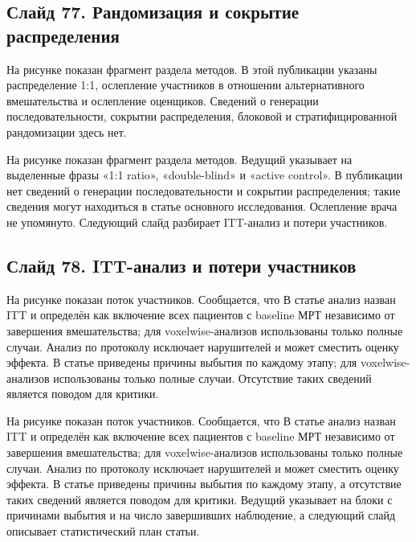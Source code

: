 \documentclass[11pt,a4paper]{article}
\begin{document}
\subsection*{Слайд 77. Рандомизация и сокрытие распределения}
\begin{onslide}
На рисунке показан фрагмент раздела методов. В этой публикации указаны распределение 1:1, ослепление участников в отношении альтернативного вмешательства и ослепление оценщиков. Сведений о генерации последовательности, сокрытии распределения, блоковой и стратифицированной рандомизации здесь нет.
\end{onslide}
На рисунке показан фрагмент раздела методов. Ведущий указывает на выделенные фразы «1:1 ratio», «double-blind» и «active control». В публикации нет сведений о генерации последовательности и сокрытии распределения; такие сведения могут находиться в статье основного исследования. Ослепление врача не упомянуто. Следующий слайд разбирает ITT-анализ и потери участников.

\subsection*{Слайд 78. ITT-анализ и потери участников}
\begin{onslide}
На рисунке показан поток участников. Сообщается, что В статье анализ назван ITT и определён как включение всех пациентов с baseline МРТ независимо от завершения вмешательства; для voxelwise-анализов использованы только полные случаи. Анализ по протоколу исключает нарушителей и может сместить оценку эффекта. В статье приведены причины выбытия по каждому этапу; для voxelwise-анализов использованы только полные случаи. Отсутствие таких сведений является поводом для критики.
\end{onslide}
На рисунке показан поток участников. Сообщается, что В статье анализ назван ITT и определён как включение всех пациентов с baseline МРТ независимо от завершения вмешательства; для voxelwise-анализов использованы только полные случаи. Анализ по протоколу исключает нарушителей и может сместить оценку эффекта. В статье приведены причины выбытия по каждому этапу, а отсутствие таких сведений является поводом для критики. Ведущий указывает на блоки с причинами выбытия и на число завершивших наблюдение, а следующий слайд описывает статистический план статьи.
\end{document}

